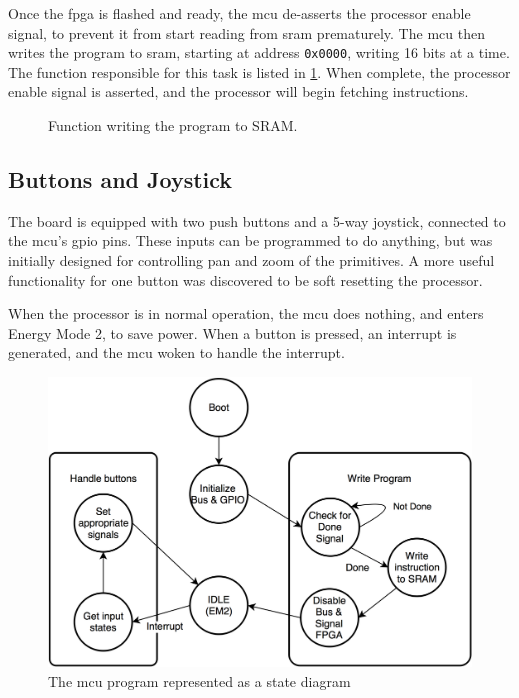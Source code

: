 Once the \gls{fpga} is flashed and ready, the \gls{mcu} de-asserts the processor enable signal, to prevent it from start reading from \gls{sram} prematurely.
The \gls{mcu} then writes the program to \gls{sram}, starting at address \texttt{0x0000}, writing 16 bits at a time. The function responsible for this task is listed in \ref{fig:write_program}.
When complete, the processor enable signal is asserted, and the processor will begin fetching instructions.

\begin{figure}
	\centering
	
	\caption{Function writing the program to SRAM.}
	\label{fig:write_program}
\end{figure}

\subsection{Buttons and Joystick}
The board is equipped with two push buttons and a 5-way joystick, connected to the \gls{mcu}'s \gls{gpio} pins.
These inputs can be programmed to do anything, but was initially designed for controlling pan and zoom of the primitives.
A more useful functionality for one button was discovered to be soft resetting the processor.

When the processor is in normal operation, the \gls{mcu} does nothing, and enters Energy Mode 2, to save power.
When a button is pressed, an interrupt is generated, and the \gls{mcu} woken to handle the interrupt.

\begin{figure}[h!]
\centering \includegraphics[width = 0.75\linewidth]{images/MCU_state.png}
\caption{The \gls{mcu} program represented as a state diagram}
\label{fig:mcu_state}
\end{figure}
